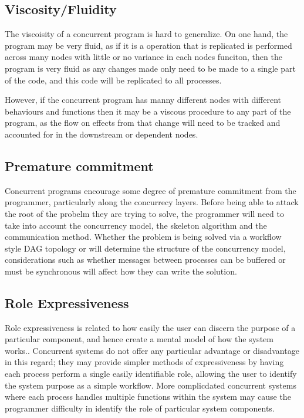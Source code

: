\documentclass{sig-alternate}
\begin{document}
\subsection{Viscosity/Fluidity}
The viscoisity of a concurrent program is hard to generalize. On one hand, the program may be very fluid, as if it is a operation that is replicated is performed across many nodes with little or no variance in each nodes funciton, then the program is very fluid as any changes made only need to be made to a single part of the code, and this code will be replicated to all processes.

However, if the concurrent program  has manny different nodes with different behaviours and functions then it may be a viscous procedure to any part of the program, as the flow on effects from that change will need to be tracked and accounted for in the downstream or dependent nodes.

\subsection{Premature commitment}
Concurrent programs encourage some degree of premature commitment from the programmer, particularly along the concurrecy layers. Before being able to attack the root of the probelm they are trying to solve, the programmer will need to take into account the concurrency model, the skeleton algorithm and the communication method. Whether the problem is being solved via a workflow style DAG topology or will determine the structure of the concurrency model, considerations such as whether messages between processes can be buffered or must be synchronous will affect how they can write the solution.

\subsection{Role Expressiveness}
Role expressiveness is related to how easily the user can discern the purpose of a particular component, and hence create a mental model of how the system works.. Concurrent systems do not offer any particular advantage or disadvantage in this regard; they may provide simpler methods of expressiveness by having each process perform a single easily identifiable role, allowing the user to identify the system purpose as a simple workflow. More complicdated concurrent systems where each process handles multiple functions within the system may cause the programmer difficulty in identify the role of particular system components. 
\end{document}
